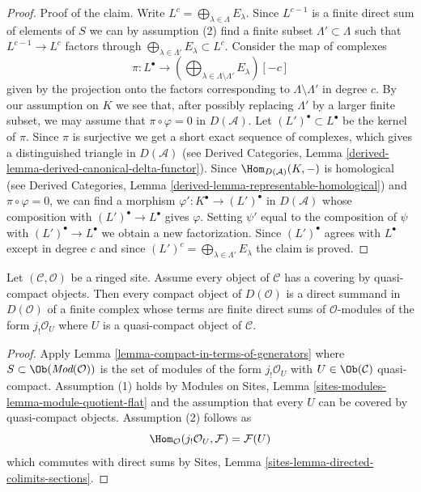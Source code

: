 \begin{proof}
\medskip\noindent
Proof of the claim. Write $L^c = \bigoplus_{\lambda \in \Lambda} E_\lambda$.
Since $L^{c - 1}$ is a finite direct sum of elements of $S$
we can by assumption (2) find a finite subset
$\Lambda' \subset \Lambda$ such that $L^{c - 1} \to L^c$ factors
through $\bigoplus_{\lambda \in \Lambda'} E_\lambda \subset L^c$.
Consider the map of complexes
$$
\pi :
L^\bullet
\longrightarrow
(\bigoplus\nolimits_{\lambda \in \Lambda \setminus \Lambda'} E_\lambda)[-c]
$$
given by the projection onto the factors corresponding to
$\Lambda \setminus \Lambda'$ in degree $c$.
By our assumption on $K$ we see that, after possibly replacing $\Lambda'$ by
a larger finite subset, we may assume that $\pi \circ \varphi = 0$
in $D(\mathcal{A})$.
Let $(L')^\bullet \subset L^\bullet$ be the kernel of $\pi$.
Since $\pi$ is surjective we get a short exact sequence of complexes,
which gives a distinguished triangle in $D(\mathcal{A})$ (see
Derived Categories, Lemma \ref{derived-lemma-derived-canonical-delta-functor}).
Since $\Hom_{D(\mathcal{A})}(K, -)$ is homological (see
Derived Categories, Lemma \ref{derived-lemma-representable-homological})
and $\pi \circ \varphi = 0$, we can find a morphism
$\varphi' : K^\bullet \to (L')^\bullet$ in $D(\mathcal{A})$ whose
composition with $(L')^\bullet \to L^\bullet$ gives $\varphi$.
Setting $\psi'$ equal to the composition of $\psi$ with
$(L')^\bullet \to L^\bullet$ we obtain a new factorization.
Since $(L')^\bullet$ agrees with $L^\bullet$ except in degree $c$
and since $(L')^c = \bigoplus_{\lambda \in \Lambda'} E_\lambda$ the
claim is proved.
\end{proof}

\begin{lemma}
\label{lemma-compact-objects-if-enough-qc}
Let $(\mathcal{C}, \mathcal{O})$ be a ringed site. Assume every object of
$\mathcal{C}$ has a covering by quasi-compact objects. Then every
compact object of $D(\mathcal{O})$ is a direct summand in $D(\mathcal{O})$
of a finite complex whose terms are finite direct sums of
$\mathcal{O}$-modules of the form $j_!\mathcal{O}_U$
where $U$ is a quasi-compact object of $\mathcal{C}$.
\end{lemma}

\begin{proof}
Apply Lemma \ref{lemma-compact-in-terms-of-generators}
where $S \subset \Ob(\textit{Mod}(\mathcal{O}))$ is the set of modules
of the form $j_!\mathcal{O}_U$ with $U \in \Ob(\mathcal{C})$
quasi-compact. Assumption (1) holds by
Modules on Sites, Lemma \ref{sites-modules-lemma-module-quotient-flat}
and the assumption that every $U$ can be covered by quasi-compact
objects. Assumption (2) follows as
$$
\Hom_\mathcal{O}(j_!\mathcal{O}_U, \mathcal{F}) = \mathcal{F}(U)
$$
which commutes with direct sums by
Sites, Lemma \ref{sites-lemma-directed-colimits-sections}.
\end{proof}


